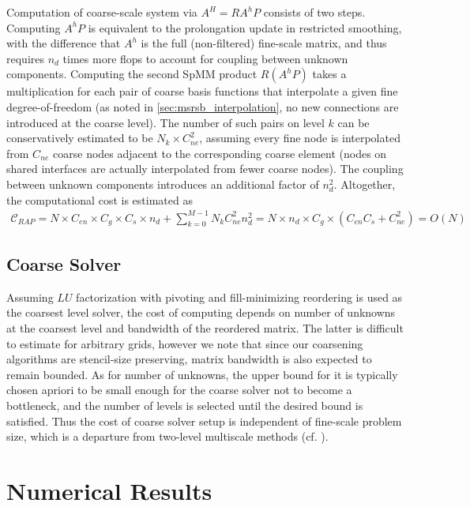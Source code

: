 Computation of coarse-scale system via $A^H = RA^hP$ consists of two steps.   Computing $A^h P$ is equivalent to the prolongation update in restricted smoothing, with the difference that $A^h$ is the full (non-filtered) fine-scale matrix, and thus requires $n_d$ times more flops to account for coupling between unknown components.   Computing the second SpMM product $R(A^hP)$ takes a multiplication for each pair of coarse basis functions that interpolate a given fine degree-of-freedom (as noted in \cref{sec:msrsb_interpolation}, no new connections are introduced at the coarse level).   The number of such pairs on level $k$ can be conservatively estimated to be $N_k \times C_{ne}^2$, assuming every fine node is interpolated from $C_{ne}$ coarse nodes adjacent to the corresponding coarse element (nodes on shared interfaces are actually interpolated from fewer coarse nodes).   The coupling between unknown components introduces an additional factor of $n_d^2$.   Altogether, the computational cost is estimated as
\begin{align}
    \mathcal{C}_{RAP} = N \times C_{en} \times C_g \times C_s \times n_d + \sum\limits_{k=0}^{M-1} N_k C_{ne}^2 n_d^2 = N \times n_d \times C_g \times \left(C_{en} C_s + C_{ne}^2\right) = O(N)
\end{align}

\subsection{Coarse Solver}
Assuming $LU$ factorization with pivoting and fill-minimizing reordering is used as the coarsest level solver, the cost of computing depends on number of unknowns at the coarsest level and bandwidth of the reordered matrix.   The latter is difficult to estimate for arbitrary grids, however we note that since our coarsening algorithms are stencil-size preserving, matrix bandwidth is also expected to remain bounded.   As for number of unknowns, the upper bound for it is typically chosen apriori to be small enough for the coarse solver not to become a bottleneck, and the number of levels is selected until the desired bound is satisfied.   Thus the cost of coarse solver setup is independent of fine-scale problem size, which is a departure from two-level multiscale methods (cf. \cite{Manea2016}).

\section{Numerical Results}
\label{sec:par_results}

